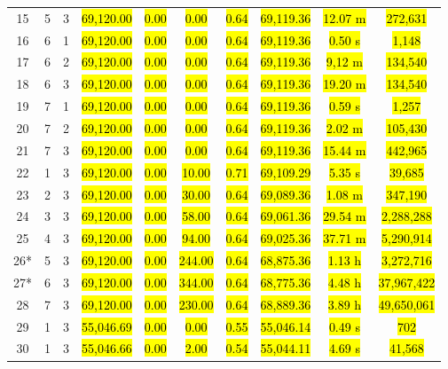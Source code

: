 \documentclass{singlecol}
\theoremstyle{TH}{
\newtheorem{lemma}{Lemma}
\newtheorem{theorem}[lemma]{Theorem}
\newtheorem{corrolary}[lemma]{Corrolary}
\newtheorem{conjecture}[lemma]{Conjecture}
\newtheorem{proposition}[lemma]{Proposition}
\newtheorem{claim}[lemma]{Claim}
\newtheorem{stheorem}[lemma]{Wrong Theorem}
\newtheorem{algorithm}{Algorithm}
}
\theoremstyle{THrm}{
\newtheorem{definition}{Definition}[section]
\newtheorem{question}{Question}[section]
\newtheorem{remark}{Remark}
\newtheorem{scheme}{Scheme}
}
\theoremstyle{THhit}{
\newtheorem{case}{Case}[section]
}
\begin{document}
\begin{table}[h!]
\begin{center}
\begin{small}
\begin{tabular}{ c c c c c c c c c c }
	 15  &  5 & 3  & \hl{69,120.00}  &  \hl{0.00}  & \hl{0.00} &  \hl{0.64}   &   \hl{69,119.36}  & \hl{12.07 m} & \hl{272,631}     \\
	 16  &  6 & 1  & \hl{69,120.00}  &  \hl{0.00}  & \hl{0.00} &  \hl{0.64}   &   \hl{69,119.36}  & \hl{0.50 s} & \hl{1,148} \\
	 17  &  6 & 2  & \hl{69,120.00}  &  \hl{0.00}  & \hl{0.00} &  \hl{0.64}   &   \hl{69,119.36}  & \hl{9,12 m} & \hl{134,540} \\
	 18  &  6 & 3  & \hl{69,120.00}  &  \hl{0.00}  & \hl{0.00} &  \hl{0.64}   &   \hl{69,119.36}  & \hl{19.20 m} & \hl{134,540} \\
	 19  &  7 & 1  & \hl{69,120.00}  &  \hl{0.00}  & \hl{0.00} &  \hl{0.64}   &   \hl{69,119.36}  & \hl{0.59 s} & \hl{1,257} \\
	 20  &  7 & 2  & \hl{69,120.00}  &  \hl{0.00}  & \hl{0.00} &  \hl{0.64}   &   \hl{69,119.36}  & \hl{2.02 m} & \hl{105,430} \\
	 21  &  7 & 3  & \hl{69,120.00}  &  \hl{0.00}  & \hl{0.00} &  \hl{0.64}   &   \hl{69,119.36}  & \hl{15.44 m} & \hl{442,965} \\
     22  &  1 & 3  & \hl{69,120.00}  &  \hl{0.00}  & \hl{10.00} &  \hl{0.71}   &   \hl{69,109.29}  & \hl{5.35 s} & \hl{39,685} \\
	 23  &  2 & 3  & \hl{69,120.00}  &  \hl{0.00}  & \hl{30.00} &  \hl{0.64}   &   \hl{69,089.36}  & \hl{1.08 m} & \hl{347,190} \\
	 24  & 3 & 3  & \hl{69,120.00}  &  \hl{0.00}  & \hl{58.00} &  \hl{0.64}   &   \hl{69,061.36}  & \hl{29.54 m} & \hl{2,288,288} \\
	 25  & 4 & 3  & \hl{69,120.00}  &  \hl{0.00}  & \hl{94.00} &  \hl{0.64}   &   \hl{69,025.36}  & \hl{37.71 m} & \hl{5,290,914} \\
     26*  & 5 & 3  & \hl{69,120.00}  &  \hl{0.00}  & \hl{244.00} &  \hl{0.64}   &   \hl{68,875.36}  & \hl{1.13 h} & \hl{3,272,716} \\
	 27*  & 6 & 3  & \hl{69,120.00}  &  \hl{0.00}  & \hl{344.00} &  \hl{0.64}   &   \hl{68,775.36}  & \hl{4.48 h} & \hl{37,967,422} \\
	 28  & 7 & 3  & \hl{69,120.00}  &  \hl{0.00}  & \hl{230.00} &  \hl{0.64}   &   \hl{68,889.36}  & \hl{3.89 h} & \hl{49,650,061} \\
	 29  & 1 & 3  & \hl{55,046.69}  &  \hl{0.00}  & \hl{0.00} &  \hl{0.55}   &   \hl{55,046.14}  & \hl{0.49 s} & \hl{702} \\
	 30  & 1 & 3  & \hl{55,046.66}  &  \hl{0.00}  & \hl{2.00} &  \hl{0.54}   &   \hl{55,044.11}  & \hl{4.69 s} & \hl{41,568} \\

\end{tabular}
\end{small}
\end{center}
\end{table}
\end{document}
